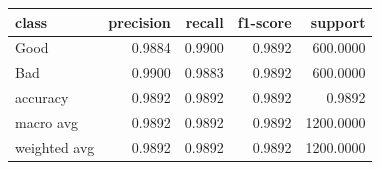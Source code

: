 \begin{tabular}{lrrrr}
\toprule
class & precision & recall & f1-score & support \\
\midrule
Good & 0.9884 & 0.9900 & 0.9892 & 600.0000 \\
Bad & 0.9900 & 0.9883 & 0.9892 & 600.0000 \\
accuracy & 0.9892 & 0.9892 & 0.9892 & 0.9892 \\
macro avg & 0.9892 & 0.9892 & 0.9892 & 1200.0000 \\
weighted avg & 0.9892 & 0.9892 & 0.9892 & 1200.0000 \\
\bottomrule
\end{tabular}
